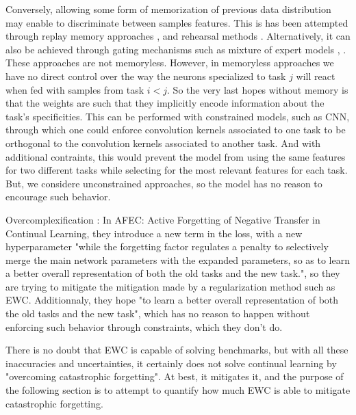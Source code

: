 \documentclass[11pt]{article}
\begin{document}
\vspace{1mm}
\noindent
Conversely, allowing some form of memorization of previous data distribution may enable to discriminate between samples features. This is has been attempted through replay memory approaches \cite{replay1}, \cite{replay2} and rehearsal methods \cite{rehearsal}. Alternatively, it can also be achieved through gating mechanisms such as mixture of expert models \cite{moe}, \cite{dmoe}. These approaches are not memoryless. However, in memoryless approaches we have no direct control over the way the neurons specialized to task $j$ will react when fed with samples from task $i<j$. So the very last hopes without memory is that the weights are such that they implicitly encode information about the task's specificities. This can be performed with constrained models, such as CNN, through which one could enforce convolution kernels associated to one task to be orthogonal to the convolution kernels associated to another task. And with additional contraints, this would prevent the model from using the same features for two different tasks while selecting for the most relevant features for each task. But, we considere unconstrained approaches, so the model has no reason to encourage such behavior.














\vspace{1mm}
\noindent
Overcomplexification : In AFEC: Active Forgetting of Negative Transfer in Continual Learning, they introduce a new term in the loss, with a new hyperparameter "while the forgetting factor regulates a penalty to selectively merge the main network parameters with the expanded parameters, so as to learn a better overall representation of both the old tasks and the new task.", so they are trying to mitigate the mitigation made by a regularization method such as EWC. Additionnaly, they hope "to learn a better overall representation of both the old tasks and the new task", which has no reason to happen without enforcing such behavior through constraints, which they don't do.

There is no doubt that EWC is capable of solving benchmarks, but with all these inaccuracies and uncertainties, it certainly does not solve continual learning by "overcoming catastrophic forgetting". At best, it mitigates it, and the purpose of the following section is to attempt to quantify how much EWC is able to mitigate catastrophic forgetting.
\end{document}
